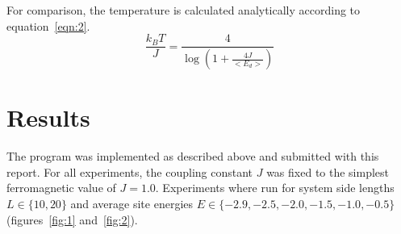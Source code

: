 \documentclass[11pt,a4paper]{article}
\begin{document}
For comparison, the temperature is calculated analytically according to equation~\ref{eqn:2}.
\begin{equation}
	\frac{k_BT}{J} = \frac{4}{\log(1+\frac{4J}{<E_d>})}
\label{eqn:2}
\end{equation}


\section{Results}

The program was implemented as described above and submitted with this report. 
For all experiments, the coupling constant $J$ was fixed to the simplest ferromagnetic value of $J=1.0$. 
Experiments where run for system side lengths $L \in \{10, 20\}$ and average site energies $E \in \{-2.9, -2.5, -2.0, -1.5, -1.0, -0.5\}$ (figures~\ref{fig:1} and~\ref{fig:2}).
\end{document}
